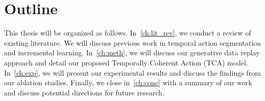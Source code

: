 \section{Outline}
This thesis will be organized as follows. In~\cref{ch:lit_rev}, we conduct a review of existing literature. We will discuss previous work in temporal action segmentation and incremental learning. In~\cref{ch:meth}, we will discuss our generative data replay approach and detail our proposed Temporally Coherent Action (TCA) model. In~\cref{ch:exp}, we will present our experimental results and discuss the findings from our ablation studies. Finally, we close in~\cref{ch:conc} with a summary of our work and discuss potential directions for future research.






